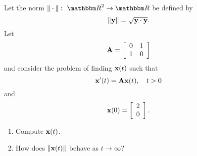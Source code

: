 Let the norm $\norm{\cdot}:\mbox{ }\R^2\rightarrow\R$ be defined by
\[
\|{\bf y}\| = \sqrt{{\bf y}\cdot {\bf y}}.
\]
Let
\[
{\bf A} = \left[\begin{array}{cc}0 & 1 \\ 1 &  0\end{array}\right]
\]
and consider the problem of finding ${\bf x}(t)$ such that
\[
{\bf x}'(t) = {\bf A}{\bf x}(t),\quad t>0
\]
and
\[
{\bf x}(0) = \left[\begin{array}{c}2 \\ 0\end{array}\right].
\]
\begin{enumerate}
\item Compute ${\bf x}(t)$.
\\
\item How does $\|{\bf x}(t)\|$ behave as $t\to\infty$?
\end{enumerate}

